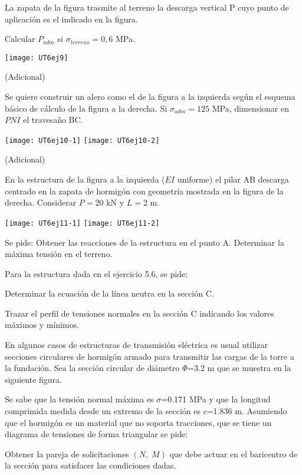 \ejercicio 

La zapata de la figura trasmite al terreno la descarga vertical P cuyo punto de aplicación es el indicado en la figura.

Calcular $P_{adm}$ si $\sigma_{terreno}=0,6$ MPa.

\begin{center}
\texttt{[image: UT6ej9]}
\end{center}

\ejercicio (Adicional)

Se quiere construir un alero como el de la figura a la izquierda según el esquema básico de cálculo de la figura a la derecha. Si $\sigma_{adm}=125$ MPa, dimensionar en $PNI$ el travesaño BC.

\begin{center}
\texttt{[image: UT6ej10-1]}
\hspace{0.01\textwidth}
\texttt{[image: UT6ej10-2]}
\end{center}

\ejercicio (Adicional)

En la estructura de la figura a la izquierda ($EI$ uniforme) el pilar AB descarga centrado en la zapata de hormigón con geometría mostrada en la figura de la derecha. Considerar $P=20$ kN y $L=2$ m.

\begin{center}
\texttt{[image: UT6ej11-1]}
\hspace{0.03\textwidth}
\texttt{[image: UT6ej11-2]}
\end{center}

Se pide:
\parte Obtener las reacciones de la estructura en el punto A.
\parte Determinar la máxima tensión en el terreno.



\ejercicio

Para la estructura dada en el ejercicio 5.6, se pide:

\parte Determinar la ecuación de la línea neutra en la sección C.

\parte Trazar el perfil de tensiones normales en la sección C indicando los valores máximos y mínimos.

\ejercicio

En algunos casos de estructuras de transmisión eléctrica es usual utilizar secciones circulares de hormigón armado para transmitir las cargas de la torre a la fundación. Sea la sección circular de diámetro $\Phi$=3.2 m que se muestra en la siguiente figura. 

\begin{center}
	\def\svgwidth{0.35\textwidth}
	
\end{center}

Se sabe que la tensión normal máxima es $\sigma$=0.171 MPa y que la longitud comprimida medida desde un extremo de la sección es $c$=1.836 m. Asumiendo que el hormigón es un material que no soporta tracciones, que se tiene un diagrama de tensiones de forma triangular se pide:

\parte Obtener la pareja de solicitaciones $(N,\;M)$ que debe actuar en el baricentro de la sección para satisfacer las condiciones dadas.



